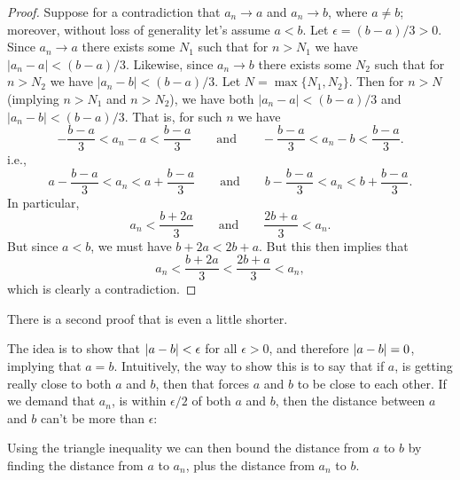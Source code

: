 \documentclass[11pt,twoside=off,numbers=noenddot]{scrbook}
\begin{document}
\begin{proof}
  Suppose for a contradiction that $a_n \to a$ and $a_n \to b$, where
  $a \neq b$; moreover, without loss of generality let's assume $a <
  b$. Let $\epsilon = (b - a)/3 > 0$. Since $a_n \to a$ there
  exists some $N_1$ such that for $n > N_1$ we have $|a_n - a| < (b -
  a)/3$. Likewise, since $a_n \to b$ there exists some $N_2$ such
  that for $n > N_2$ we have $|a_n - b| < (b - a)/3$. Let $N =
  \max\{N_1, N_2\}$. Then for $n > N$ (implying $n > N_1$ and $n >
  N_2$), we have both $|a_n - a| < (b - a)/3$ and $|a_n - b| < (b -
  a)/3$. That is, for such $n$ we have
  \[ -\frac{b-a}{3} < a_n - a < \frac{b-a}{3} \qquad \text{and}
  \qquad -\frac{b-a}{3} < a_n - b < \frac{b-a}{3}. \]
  i.e.,
  \[ a - \frac{b-a}{3} < a_n < a + \frac{b-a}{3} \qquad \text{and}
  \qquad b - \frac{b-a}{3} < a_n < b + \frac{b-a}{3}. \]
  In particular,
  \[ a_n < \frac{b+2a}{3} \qquad \text{and} \qquad \frac{2b+a}{3} < a_n. \]
  But since $a < b$, we must have $b + 2a < 2b + a$. But this then implies that
  \[ a_n < \frac{b+2a}{3} < \frac{2b+a}{3} < a_n, \]
  which is clearly a contradiction.
\end{proof}

There is a second proof that is even a little shorter.

\begin{proofidea}
  The idea is to show that $| a - b | < \epsilon$ for all $\epsilon
  > 0$, and therefore $| a - b | = 0$, implying that $a = b$.
  Intuitively, the way to show this is to say that if $a$, is getting
  really close to both $a$ and $b$, then that forces $a$ and $b$ to
  be close to each other. If we demand that $a_n$, is within
  $\epsilon/2$ of both $a$ and $b$, then the distance between $a$ and
  $b$ can't be more than $\epsilon$:

  \begin{tightfigure}
    \centering
  \end{tightfigure}

  Using the triangle inequality we can then bound the distance from
  $a$ to $b$ by finding the distance from $a$ to $a_n$, plus the
  distance from $a_n$ to $b$.
\end{proofidea}
\end{document}
